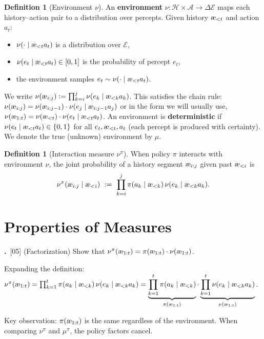 \documentclass[fontsize=11pt, parskip=half]{scrartcl}
\theoremstyle{definition}
\newtheorem{definition}[theorem]{Definition}
\newenvironment{solution}{%
    \begin{tcolorbox}[colback=black!5!white, colframe=black!50!white,
      title={\textbf{Solution}}, fonttitle=\normalfont, breakable]
  }{\end{tcolorbox}}
\newenvironment{solution}{\expandafter\comment}{\expandafter\endcomment}
\newcommand{\mysubsection}[2]{\par\medskip\noindent\refstepcounter{subsection}\textbf{\thesubsection.}~#2\par\smallskip}
\newcommand{\cA}{\mathcal{A}}
\newcommand{\cE}{\mathcal{E}}
\newcommand{\cH}{\mathcal{H}}
\newcommand{\aes}{\textnormal{\ae}}
\begin{document}
\begin{definition}[Environment $\nu$]\label{def:environment}
An \textbf{environment} $\nu : \cH \times \cA \to \Delta \cE$ maps each history--action pair to a distribution over percepts. Given history $\aes_{<t}$ and action $a_t$:
\begin{itemize}\itemsep=2pt
    \item $\nu(\cdot \mid \aes_{<t} a_t)$ is a distribution over $\cE$,
    \item $\nu(e_t \mid \aes_{<t} a_t) \in [0,1]$ is the probability of percept $e_t$,
    \item the environment samples $e_t \sim \nu(\cdot \mid \aes_{<t} a_t)$.
\end{itemize}
We write $\nu(\aes_{i:j}) := \prod_{k=i}^j \nu(e_k \mid \aes_{<k} a_k)$.
This satisfies the chain rule: $\nu(\aes_{i:j}) = \nu(\aes_{i:j-1}) \cdot \nu(e_j \mid \aes_{i:j-1} a_j)$ or in the form we will usually use, $\nu(\aes_{1:t}) = \nu(\aes_{<t}) \cdot \nu(e_t \mid \aes_{<t} a_t)$.
An environment is \textbf{deterministic} if $\nu(e_t \mid \aes_{<t} a_t) \in \{0,1\}$ for all $e_t, \aes_{<t}, a_t$ (each percept is produced with certainty).
We denote the true (unknown) environment by $\mu$.
\end{definition}

\begin{definition}[Interaction measure $\nu^\pi$]\label{def:interaction}
When policy $\pi$ interacts with environment $\nu$, the joint probability of a history segment $\aes_{i:j}$ given past $\aes_{<i}$ is
\[
    \nu^\pi(\aes_{i:j} \mid \aes_{<i})
    ~:=~ \prod_{k=i}^j \pi(a_k \mid \aes_{<k})\, \nu(e_k \mid \aes_{<k} a_k).
\]
\end{definition}


\setcounter{section}{-1}
\section{Properties of Measures}\label{prob:measures}

\mysubsection{1}{[05] (Factorization)\label{prob:factorization}
Show that $\nu^\pi(\aes_{1:t}) = \pi(\aes_{1:t}) \cdot \nu(\aes_{1:t})$.}

\begin{solution}
Expanding the definition:
$\nu^\pi(\aes_{1:t})
= \prod_{k=1}^t \pi(a_k \mid \aes_{<k})\, \nu(e_k \mid \aes_{<k} a_k)
= \underbrace{\prod_{k=1}^t \pi(a_k \mid \aes_{<k})}_{\pi(\aes_{1:t})} \cdot \underbrace{\prod_{k=1}^t \nu(e_k \mid \aes_{<k} a_k)}_{\nu(\aes_{1:t})}$.

Key observation: $\pi(\aes_{1:t})$ is the same regardless of the environment. When comparing $\nu^\pi$ and $\mu^\pi$, the policy factors cancel.
\end{solution}
\end{document}
